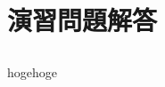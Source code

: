 \chapter{演習問題解答} \label{chap:answer}

\section*{}

\subsection*{} \label{answer:termexample}

hogehoge